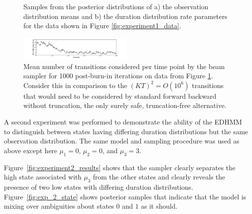 \begin{figure}
    \caption{Samples from the posterior distributions of a) the observation distribution means and b) the duration distribution rate parameters for the data shown in Figure \ref{fig:experiment1_data}.}
    \label{fig:experiment1_results}
\end{figure}

\begin{figure}
    \includegraphics[width=0.5\textwidth]{../pic/number_transitions_visited.pdf}

\caption{Mean number of transitions considered per time point by the beam sampler for 1000 post-burn-in iterations on data from Figure \ref{fig:experiment1_results}. Consider this in comparison to the $(KT)^2 = O(10^6)$ transitions that would need to be considered by standard forward backward without truncation, the only surely safe, truncation-free alternative.}
\label{fig:allowed}
\end{figure}

A second experiment was performed to demonstrate the ability of the EDHMM to distinguish between states having differing duration distributions but the same observation distribution. The same model and sampling procedure was used as above except here $\mu_1 = 0$, $\mu_2 = 0$, and $\mu_3 = 3$.

Figure~\ref{fig:experiment2_results} shows that the sampler clearly separates the high state associated with $\mu_3$ from the other states and clearly 
reveals the presence of
two  low states with differing duration distributions.   
Figure~\ref{fig:exp_2_state} shows posterior samples that indicate that the model is mixing over ambiguities about states $0$ and $1$ as it should. %


